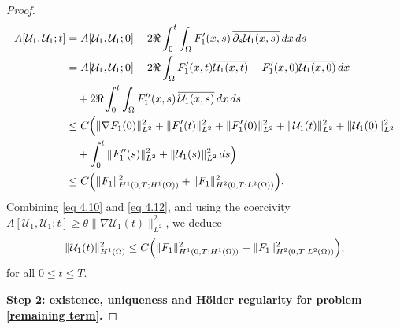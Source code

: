 \documentclass[11pt,reqno,oneside]{amsart}
\numberwithin{equation}{section}
\theoremstyle{definition}
\theoremstyle{remark}
\numberwithin{equation}{section}
\begin{document}
\begin{proof}
		\begin{equation}\label{eq 4.12}
			\begin{aligned}
				A[\mathcal{U}_1,\mathcal{U}_1;t]
				&=A[\mathcal{U}_1,\mathcal{U}_1;0]
				-2\Re\int_{0}^{t}\int_{\Omega}
				F_1'(x,s)\,\overline{\partial_s\mathcal{U}_1(x,s)}\,dx\,ds 
				\\
				&=A[\mathcal{U}_1,\mathcal{U}_1;0]
				-2\Re\int_{\Omega}
				F_1'(x,t)\overline{\mathcal{U}_1(x,t)}
				-F_1'(x,0)\overline{\mathcal{U}_1(x,0)}\,dx
				\\
				&\quad
				+2\Re\int_{0}^{t}\int_{\Omega}
				F_1''(x,s)\,\overline{\mathcal{U}_1(x,s)}\,dx\,ds
				\\
				&\le C\Bigl(\|\nabla F_1(0)\|_{L^{2}}^{2}
				+\|F_1'(t)\|_{L^{2}}^{2}
				+\|F_1'(0)\|_{L^{2}}^{2}
				+\|\mathcal{U}_1(t)\|_{L^{2}}^{2}
				+\|\mathcal{U}_1(0)\|_{L^{2}}^{2}
				\\
				&\quad
				+\int_{0}^{t}\|F_1''(s)\|_{L^{2}}^{2}
				+\|\mathcal{U}_1(s)\|_{L^{2}}^{2}\,ds\Bigr)
				\\
				&\le C\Bigl(
				\|F_1\|_{H^{1}(0,T;H^{1}(\Omega))}^{2}
				+\|F_1\|_{H^{2}(0,T;L^{2}(\Omega))}^{2}
				\Bigr).
			\end{aligned}
		\end{equation}
		Combining \eqref{eq 4.10} and \eqref{eq 4.12}, and using the coercivity
		$A[\mathcal{U}_1,\mathcal{U}_1;t]\ge \theta\|\nabla \mathcal{U}_1(t)\|_{L^{2}}^{2}$, we deduce
		\begin{equation}\label{eq 4.14}
			\|\mathcal{U}_1(t)\|_{H^{1}(\Omega)}^{2}
			\le C\Bigl(\|F_1\|_{H^{1}(0,T;H^{1}(\Omega))}^{2}
			+\|F_1\|_{H^{2}(0,T;L^{2}(\Omega))}^{2}\Bigr),
		\end{equation}
		for all $0\le t\le T$.
	
		\textbf{Step 2: existence, uniqueness and Hölder regularity for problem \eqref{remaining term}.}
		

\end{proof}
\end{document}
